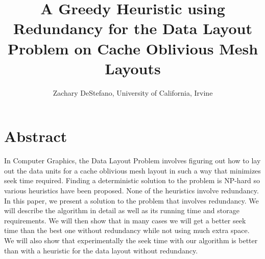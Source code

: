 \documentclass[11pt,psfig]{article}
\begin{document}
\setlength{\parskip}{1.2ex plus0.3ex minus 0.3ex}


\thispagestyle{empty} \pagestyle{myheadings} 



\title{A Greedy Heuristic using Redundancy for the Data Layout Problem on Cache Oblivious Mesh Layouts}
\author{Zachary DeStefano, University of California, Irvine}

\maketitle

\vfill\eject

\section*{Abstract}

In Computer Graphics, the Data Layout Problem involves figuring out how to lay out the data units for a cache oblivious mesh layout in such a way that minimizes seek time required. Finding a deterministic solution to the problem is NP-hard so various heuristics have been proposed. None of the heuristics involve redundancy. In this paper, we present a solution to the problem that involves redundancy. We will describe the algorithm in detail as well as its running time and storage requirements. We will then show that in many cases we will get a better seek time than the best one without redundancy while not using much extra space. We will also show that experimentally the seek time with our algorithm is better than with a heuristic for the data layout without redundancy.   

\end{document}
